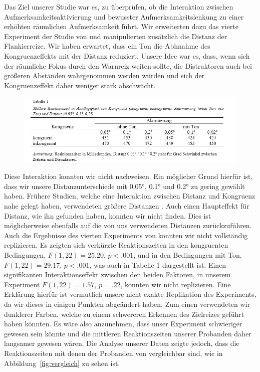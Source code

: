 Das Ziel unserer Studie war es, zu überprüfen, ob die Interaktion zwischen Aufmerksamkeitsaktivierung und bewusster Aufmerksamkeitslenkung zu einer erhöhten räumlichen Aufmerksamkeit führt. Wir erweiterten dazu das vierte Experiment der Studie von  und manipulierten zusätzlich die Distanz der Flankierreize.
Wir haben erwartet, dass ein Ton die Abhnahme des Kongruenzeffekts mit der Distanz reduziert. Unsere Idee war es, dass, wenn sich der räumliche Fokus durch den Warnreiz weiten sollte, die Distraktoren auch bei größeren Abständen wahrgenommen werden würden und sich der Kongruenzeffekt daher weniger stark abschwächt.\\
\begin{figure}[t]
	\centering
  \includegraphics[width=\textwidth]{grafiken/Table-Kong_RT.png}
\end{figure}
Diese Interaktion konnten wir nicht nachweisen. Ein möglicher Grund hierfür ist, dass wir unsere Distanzunterschiede mit 0.05°, 0.1° und 0.2° zu gering gewählt haben. Frühere Studien, welche eine Interaktion zwischen Distanz und Kongruenz nahe gelegt haben, verwendeten größere Distanzen \cite{eriksen1974effects}. Auch einen Haupteffekt für Distanz, wie ihn  gefunden haben, konnten wir nicht finden. Dies ist möglicherweise ebenfalls auf die von uns verwendeten Distanzen zurückzuführen.\\
Auch die Ergebnisse des vierten Experiments von  konnten wir nicht vollständig replizieren. Es zeigten sich verkürzte Reaktionszeiten in den kongruenten Bedingungen, $F(1,22)=25.20$, $p<.001$, und in den Bedingungen mit Ton, $F(1,22)=29.17$, $p<.001$, was auch in Tabelle 1 dargestellt ist. Einen signifikanten Interaktionseffekt zwischen den beiden Faktoren, in unserem Experiment $F(1,22)=1.57$, $p=.22$, konnten wir nicht replizieren.
Eine Erklärung hierfür ist vermutlich unsere nicht exakte Replikation des Experiments, da wir dieses in einigen Punkten abgeändert haben. Zum einen verwendeten wir dunklerer Farben, welche zu einem schwereren Erkennen des Zielreizes geführt haben könnten. Es wäre also anzunehmen, dass unser Experiment schwieriger gewesen sein könnte und die mittleren Reaktionszeiten unserer Probanden daher langsamer gewesen wären. Die Analyse unserer Daten zeigte jedoch, dass die Reaktionszeiten mit denen der Probanden von  vergleichbar sind, wie in Abbildung~\ref{fig:vergleich} zu sehen ist.\\
